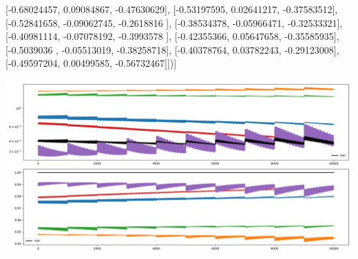 \documentclass{article}
\begin{document}
       [-0.68024457,  0.09084867, -0.47630629],
       [-0.53197595,  0.02641217, -0.37583512],
       [-0.52841658, -0.09062745, -0.2618816 ],
       [-0.38534378, -0.05966471, -0.32533321],
       [-0.40981114, -0.07078192, -0.3993578 ],
       [-0.42355366,  0.05647658, -0.35585935],
       [-0.5039036 , -0.05513019, -0.38258718],
       [-0.40378764,  0.03782243, -0.29123008],
       [-0.49597204,  0.00499585, -0.56732467]])]
\begin{center}
\includegraphics[scale=.9]{report_pickled_controls4/control_dpn_all}

\end{center}
\end{document}
